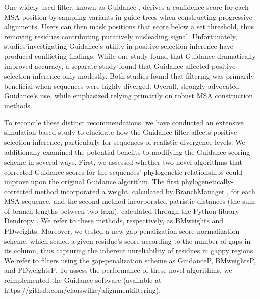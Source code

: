 \documentclass[11pt]{article}
\begin{document}
One widely-used filter, known as Guidance \citep{Penn2010}, derives a confidence score for each MSA position by sampling variants in guide trees when constructing progressive alignments. Users can then mask positions that score below a set threshold, thus removing residues contributing putatively misleading signal. Unfortunately, studies investigating Guidance's utility in positive-selection inference have produced conflicting findings. While one study \citep{Privman2012} found that Guidance dramatically improved accuracy, a separate study \citep{Jordan2012} found that Guidance affected positive-selection inference only modestly. Both studies found that filtering was primarily beneficial when sequences were highly diverged. Overall, \citet{Privman2012} strongly advocated Guidance's use, while \citet{Jordan2012} emphasized relying primarily on robust MSA construction methods. 

To reconcile these distinct recommendations, we have conducted an extensive simulation-based study to elucidate how the Guidance filter affects positive-selection inference, particularly for sequences of realistic divergence levels. We additionally examined the potential benefits to modifying the Guidance scoring scheme in several ways.  First, we assessed whether two novel algorithms that corrected Guidance scores for the sequences' phylogenetic relationships could improve upon the original Guidance algorithm. The first phylogenetically-corrected method incorporated a weight, calculated by BranchManager \citep{Stone2007}, for each MSA sequence, and the second method incorporated patristic distances (the sum of branch lengths between two taxa), calculated through the Python library Dendropy \citep{Sukumaran2010}. We refer to these methods, respectively, as BMweights and PDweights. Moreover, we tested a new gap-penalization score-normalization scheme, which scaled a given residue's score according to the number of gaps in its column, thus capturing the inherent unreliability of residues in gappy regions. We refer to filters using the gap-penalization scheme as GuidanceP, BMweightsP, and PDweightsP. To assess the performance of these novel algorithms, we reimplemented the Guidance software (available at https://github.com/clauswilke/alignment\underline{\hspace*{0.2cm}}filtering). 
\end{document}
